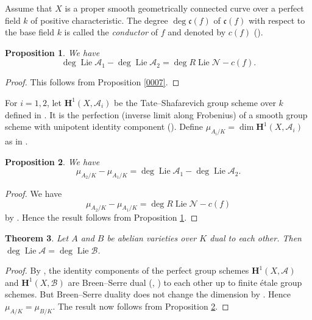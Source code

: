 \documentclass{amsart}
\newtheorem{theorem}{Theorem}[section]
\newtheorem{proposition}[theorem]{Proposition}
\theoremstyle{remark}
\numberwithin{equation}{section}
\newcommand{\alg}[1]{\mathbf{#1}}
\newcommand{\ideal}[1]{\mathfrak{#1}}
\DeclareMathOperator{\Lie}{Lie}
\begin{document}
Assume that $X$ is a proper smooth geometrically connected curve
over a perfect field $k$ of positive characteristic.
The degree $\deg \ideal{c}(f)$ of $\ideal{c}(f)$
with respect to the base field $k$
is called the \emph{conductor} of $f$ and denoted by $c(f)$
(\cite[Definition 5.1 (2)]{GRS24}).

\begin{proposition} \label{0008}
	We have
		\[
					\deg \Lie \mathcal{A}_{1}
				-
					\deg \Lie \mathcal{A}_{2}
			=
					\deg R \Lie \mathcal{N}
				-
					c(f).
		\]
\end{proposition}

\begin{proof}
	This follows from Proposition \ref{0007}.
\end{proof}

For $i = 1, 2$, let $\alg{H}^{1}(X, \mathcal{A}_{i})$ be
the Tate--Shafarevich group scheme over $k$ defined in \cite{Suz20a}.
It is the perfection (inverse limit along Frobenius)
of a smooth group scheme with unipotent identity component
(\cite[Theorem 3.4.1 (1), (2)]{Suz20a}).
Define $\mu_{A_{i} / K} = \dim \alg{H}^{1}(X, \mathcal{A}_{i})$
as in \cite[(6.1)]{GRS24}.

\begin{proposition} \label{0009}
	We have
		\[
				\mu_{A_{2} / K} - \mu_{A_{1} / K}
			=
					\deg \Lie \mathcal{A}_{1}
				-
					\deg \Lie \mathcal{A}_{2}.
		\]
\end{proposition}

\begin{proof}
	We have
		\[
				\mu_{A_{2} / K} - \mu_{A_{1} / K}
			=
					\deg R \Lie \mathcal{N}
				-
					c(f)
		\]
	by \cite[Theorem 10.3]{GRS24}.
	Hence the result follows from
	Proposition \ref{0008}.
\end{proof}

\begin{theorem} \label{0014}
	Let $A$ and $B$ be abelian varieties over $K$
	dual to each other.
	Then $\deg \Lie \mathcal{A} = \deg \Lie \mathcal{B}$.
\end{theorem}

\begin{proof}
	By \cite[Theorem 3.4.1 (6g) and Proposition 2.2.5]{Suz20a},
	the identity components of the perfect group schemes
	$\alg{H}^{1}(X, \mathcal{A})$ and
	$\alg{H}^{1}(X, \mathcal{B})$ are Breen--Serre dual
	(\cite[Chapter III, Lemma 0.13 (c)]{Mil06},
	\cite[Proposition 1.2.1]{Beg81}) to each other
	up to finite \'etale group schemes.
	But Breen--Serre duality does not change the dimension
	by \cite[Proposition 1.2.1]{Beg81}.
	Hence $\mu_{A / K} = \mu_{B / K}$.
	The result now follows from
	Proposition \ref{0009}.
\end{proof}
\end{document}

